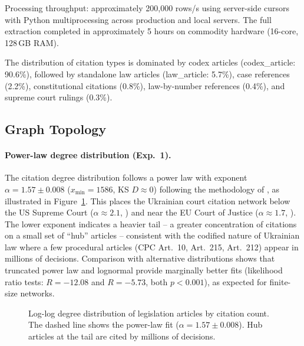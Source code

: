 \documentclass[11pt]{article}
\begin{document}
Processing throughput: approximately 200,000 rows/s using server-side cursors with Python multiprocessing across production and local servers.
The full extraction completed in approximately 5 hours on commodity hardware (16-core, 128\,GB RAM).

The distribution of citation types is dominated by codex articles (codex\_article: 90.6\%), followed by standalone law articles (law\_article: 5.7\%), case references (2.2\%), constitutional citations (0.8\%), law-by-number references (0.4\%), and supreme court rulings (0.3\%).

\subsection{Graph Topology}
\label{sec:topology}

\paragraph{Power-law degree distribution (Exp.~1).}
The citation degree distribution follows a power law with exponent $\alpha = 1.57 \pm 0.008$ ($x_{\min} = 1586$, KS $D \approx 0$) following the methodology of \citet{clauset2009power}, as illustrated in Figure~\ref{fig:degree-dist}.
This places the Ukrainian court citation network below the US Supreme Court ($\alpha \approx 2.1$, \citealt{fowler2007network}) and near the EU Court of Justice ($\alpha \approx 1.7$, \citealt{mirshahvalad2014}).
The lower exponent indicates a heavier tail -- a greater concentration of citations on a small set of ``hub'' articles -- consistent with the codified nature of Ukrainian law where a few procedural articles (CPC Art.~10, Art.~215, Art.~212) appear in millions of decisions.
Comparison with alternative distributions shows that truncated power law and lognormal provide marginally better fits (likelihood ratio tests: $R = -12.08$ and $R = -5.73$, both $p < 0.001$), as expected for finite-size networks.

\begin{figure}[t]
\centering

\caption{Log-log degree distribution of legislation articles by citation count. The dashed line shows the power-law fit ($\alpha = 1.57 \pm 0.008$). Hub articles at the tail are cited by millions of decisions.}
\label{fig:degree-dist}
\end{figure}
\end{document}
